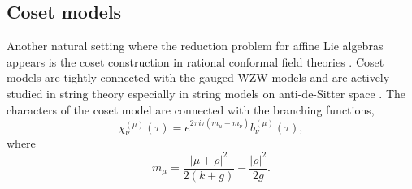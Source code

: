 \documentclass[12pt]{iopart}
\begin{document}
% 
% 
% 
\subsection{Coset models}
\label{sec:coset-models}

Another natural setting where the reduction problem for affine Lie algebras appears is
the coset construction in rational conformal field theories \cite{Goddard198588}.
Coset models are tightly connected with the gauged WZW-models and are actively studied
in string theory especially in string models on anti-de-Sitter space
\cite{Maldacena:2000hw,Maldacena:2000kv,Maldacena:2001km,Maldacena:2001ky,Aharony:1999ti}.
The characters of the coset model are connected with the branching functions,
\begin{equation}
  \label{eq:31}
  \chi^{(\mu)}_{\nu}(\tau)=e^{2\pi i \tau (m_{\mu}-m_{\nu})} b^{(\mu)}_{\nu}(\tau),
\end{equation}
where
\begin{equation}
  \label{eq:46}
  m_{\mu}=\frac{\left|\mu+\rho\right|^2}{2(k+g)}-\frac{\left|\rho\right|^2}{2g}.
\end{equation}
\end{document}
